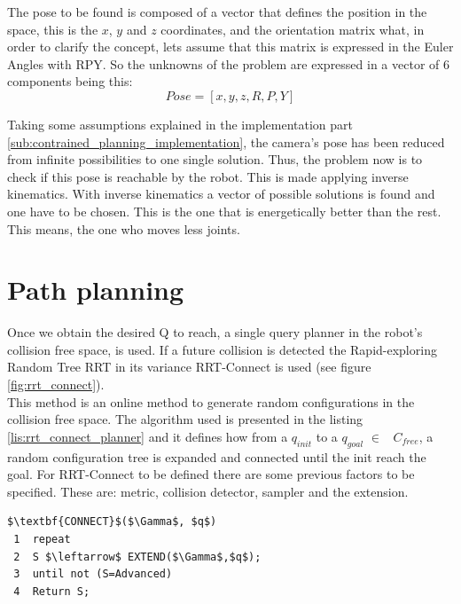 The pose to be found is composed of a vector that defines the position in the space, this is the $x$, $y$ and $z$ coordinates, and the orientation matrix what, in order to clarify the concept, lets assume that this matrix is expressed in the Euler Angles with RPY. So the unknowns of the problem are expressed in a vector of 6 components being this:
	\begin{equation}
	\label{eq:pose_cartesian_coordinates}
		Pose = [x,y,z,R,P,Y]
	\end{equation}

Taking some assumptions explained in the implementation part \ref{sub:contrained_planning_implementation}, the camera's pose has been reduced from infinite possibilities to one single solution. 
Thus, the problem now is to check if this pose is reachable by the robot. 
This is made applying inverse kinematics. 
With inverse kinematics a vector of possible solutions is found and one have to be chosen. 
This is the one that is energetically better than the rest. This means, the one who moves less joints.

\section{Path planning} %
\label{sec:path_planning}
Once we obtain the desired Q to reach, a single query planner in the robot's collision free space, is used. If a future collision is detected the Rapid-exploring Random Tree RRT in its variance RRT-Connect \cite{RRTConnect} is used (see figure \ref{fig:rrt_connect}).\\

This method is an online method to generate random configurations in the collision free space.
The algorithm used is presented in the listing \ref{lis:rrt_connect_planner} and it defines how from a $q_{init}$ to a $q_{goal}$ $\in$ \ $C_{free}$, a random configuration tree is expanded and connected  until the init reach the goal. For RRT-Connect to be defined there are some previous factors to be specified. These are: metric, collision detector, sampler and the extension.

\begin{lstlisting}[frame=tb, mathescape=true, xleftmargin=.28\textwidth, xrightmargin=.28\textwidth,caption=RRT-Connect Algorithm, label=lis:rrt_connect_planner]
$\textbf{CONNECT}$($\Gamma$, $q$)
 1  repeat 
 2  S $\leftarrow$ EXTEND($\Gamma$,$q$);
 3  until not (S=Advanced)
 4  Return S;
\end{lstlisting}
\lstset{}

